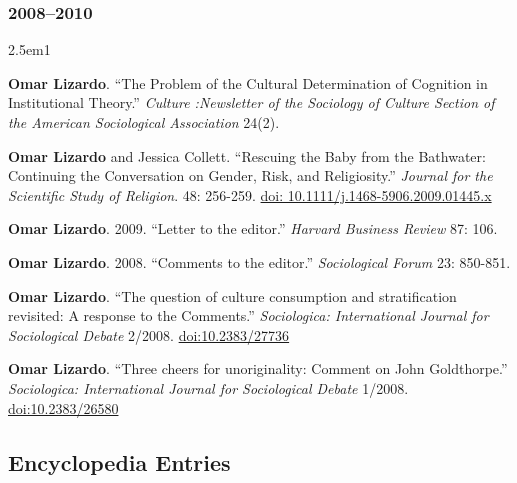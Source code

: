 \documentclass[
]{article}
\newenvironment{cventry}{\begin{hangparas}{2.5em}{1}}{\end{hangparas}}
\begin{document}
\subsubsection{2008--2010}\label{section-19}

\begin{cventry}

\textbf{Omar Lizardo}. ``The Problem of the Cultural Determination of
Cognition in Institutional Theory.'' \emph{Culture :Newsletter of the
Sociology of Culture Section of the American Sociological Association}
24(2).

\textbf{Omar Lizardo} and Jessica Collett. ``Rescuing the Baby from the
Bathwater: Continuing the Conversation on Gender, Risk, and
Religiosity.'' \emph{Journal for the Scientific Study of Religion}. 48:
256-259. \href{https://doi.org/10.1111/j.1468-5906.2009.01445.x}{doi:
10.1111/j.1468-5906.2009.01445.x}

\textbf{Omar Lizardo}. 2009. ``Letter to the editor.'' \emph{Harvard
Business Review} 87: 106.

\textbf{Omar Lizardo}. 2008. ``Comments to the editor.''
\emph{Sociological Forum} 23: 850-851.

\textbf{Omar Lizardo}. ``The question of culture consumption and
stratification revisited: A response to the Comments.''
\emph{Sociologica: International Journal for Sociological Debate}
2/2008.
\href{https://www.rivisteweb.it/doi/10.2383/27736}{doi:10.2383/27736}

\textbf{Omar Lizardo}. ``Three cheers for unoriginality: Comment on John
Goldthorpe.'' \emph{Sociologica: International Journal for Sociological
Debate} 1/2008.
\href{https://www.rivisteweb.it/doi/10.2383/26580}{doi:10.2383/26580}

\end{cventry}

\subsection{Encyclopedia Entries}\label{encyclopedia-entries}
\end{document}
